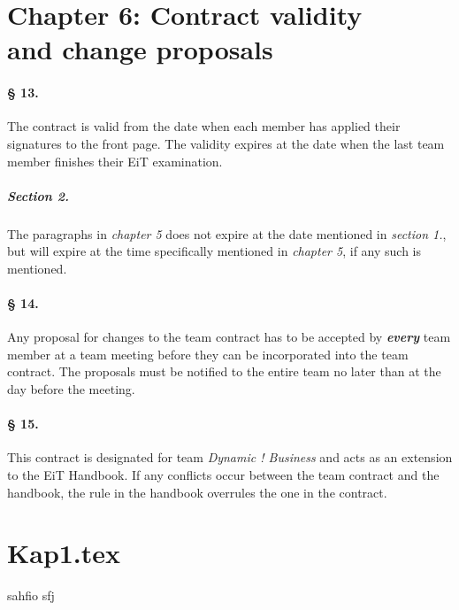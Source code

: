 \section*{Chapter 6: Contract validity \\ and change proposals}
\paragraph{§ 13.}
The contract is valid from the date when each member has applied their signatures to the front page. The validity expires at the date when the last team member finishes their EiT examination.
\subparagraph{Section 2.}
The paragraphs in \textit{chapter 5} does not expire at the date mentioned in \textit{section 1.}, but will expire at the time specifically mentioned in \emph{chapter 5}, if any such is mentioned.
\paragraph{§ 14.} \label{Change}
Any proposal for changes to the team contract has to be accepted by \textbf{\textit{every}} team member at a team meeting before they can be incorporated into the team contract. The proposals must be notified to the entire team no later than at the day before the meeting.
\paragraph{§ 15.}
This contract is designated for team \emph{Dynamic ! Business} and acts as an extension to the EiT Handbook. If any conflicts occur between the team contract and the handbook, the rule in the handbook overrules the one in the contract.

\section{Kap1.tex}

sahfio
sfj